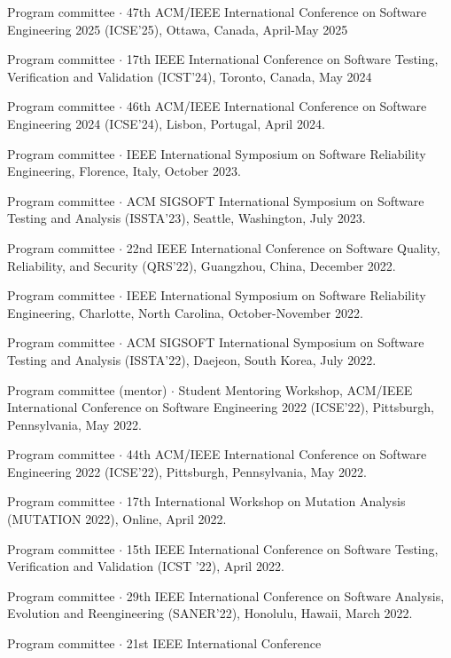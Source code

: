 \documentclass[ComputerScience]{vita}
\begin{document}
\begin{vita}
\begin{Panel and Committee Service}
  \item Program committee $\cdot$ 47th ACM/IEEE International Conference on 
    Software Engineering 2025 (ICSE'25), Ottawa, Canada, April-May 2025
\item Program committee $\cdot$ 17th IEEE International Conference on Software Testing, Verification and Validation (ICST'24), Toronto, Canada, May 2024
  \item Program committee $\cdot$ 46th ACM/IEEE International Conference on 
    Software Engineering 2024 (ICSE'24), Lisbon, Portugal, April 2024.
\item Program committee $\cdot$ IEEE International Symposium on Software Reliability Engineering, Florence, Italy, October 2023.    
\item Program committee $\cdot$ ACM SIGSOFT International Symposium on Software Testing and Analysis (ISSTA'23), Seattle, Washington, July 2023.    
    \item Program committee $\cdot$ 22nd IEEE International Conference 
    on Software Quality, Reliability, and Security (QRS'22), Guangzhou, China, December 2022.     
\item Program committee $\cdot$ IEEE International Symposium on Software Reliability Engineering, Charlotte, North Carolina, October-November 2022.
\item Program committee $\cdot$ ACM SIGSOFT International Symposium on Software Testing and Analysis (ISSTA'22), Daejeon, South Korea, July 2022.
  \item Program committee (mentor) $\cdot$ Student Mentoring Workshop, ACM/IEEE International Conference on 
  Software Engineering 2022 (ICSE'22), Pittsburgh, Pennsylvania, 
  May 2022.
  \item Program committee $\cdot$ 44th ACM/IEEE International Conference on 
  Software Engineering 2022 (ICSE'22), Pittsburgh, Pennsylvania, 
  May 2022.
  \item Program committee $\cdot$ 17th International Workshop on
    Mutation Analysis (MUTATION 2022), Online,
  April 2022.  
  \item Program committee $\cdot$ 15th  IEEE International Conference on Software Testing, Verification and Validation (ICST '22), April 2022.
\item Program committee $\cdot$ 29th IEEE International Conference on Software Analysis, Evolution and Reengineering (SANER'22), Honolulu, Hawaii, March 2022.
    \item Program committee $\cdot$ 21st IEEE International Conference 

\end{Panel and Committee Service}
\end{vita}
\end{document}
